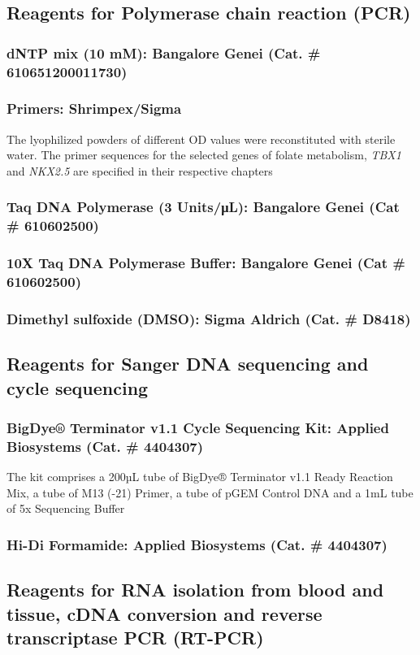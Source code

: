 \begin{refsection}
\subsection{Reagents for Polymerase chain reaction (PCR)}
\subsubsection{dNTP mix (10 mM): \textmd{Bangalore Genei (Cat. \# 610651200011730)}}
\subsubsection{Primers: \textmd{Shrimpex/Sigma}}
The lyophilized powders of different OD values were reconstituted with sterile water. The primer sequences for the selected genes of folate metabolism, \textit{TBX1} and \textit{NKX2.5} are specified in their respective chapters
\subsubsection{Taq DNA Polymerase (3 Units/μL): \textmd{Bangalore Genei (Cat \# 610602500)}}
\subsubsection{10X Taq DNA Polymerase Buffer: \textmd{Bangalore Genei (Cat \# 610602500)}}
\subsubsection{Dimethyl sulfoxide (DMSO): \textmd{Sigma Aldrich (Cat. \# D8418)}}
\subsection{Reagents for Sanger DNA  sequencing and cycle sequencing} 
\subsubsection{BigDye® Terminator v1.1 Cycle Sequencing Kit: \textmd{Applied Biosystems (Cat. \# 4404307)}}
The kit comprises a 200µL tube of BigDye® Terminator v1.1 Ready Reaction Mix, a tube of M13 (-21) Primer, a tube of pGEM Control DNA and a 1mL tube of 5x Sequencing Buffer
\nopagebreak
\subsubsection{Hi-Di Formamide: \textmd{Applied Biosystems (Cat. \# 4404307)}}
\subsection{Reagents for RNA isolation from blood and tissue, cDNA conversion  and reverse transcriptase PCR (RT-PCR)}

\end{refsection}
